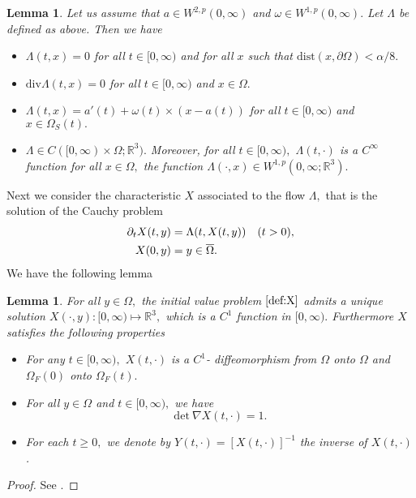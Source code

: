 \documentclass[12pt,a4paper,reqno]{amsart}
\newtheorem{lemma}[theorem]{Lemma}
\theoremstyle{definition}
\theoremstyle{remark}
\numberwithin{equation}{section}
\newcommand{\ost}{\Omega_{S}(t)}
\newcommand{\oft}{\Omega_{F}(t)}
\newcommand{\ofo}{\Omega_{F}(0)}
\newcommand{\rt}{\mathbb{R}^{3}}
\begin{document}
\begin{lemma}
Let us assume that $a \in W^{2,p}(0,\infty)$ and $\omega \in W^{1,p}(0,\infty).$ Let $\Lambda$ be defined as above. Then we have
\begin{itemize}
\item $\Lambda(t,x) = 0$ for all $t \in [0,\infty)$ and for all $x$ such that $\mathrm{dist}(x,\partial \Omega) < \alpha/8.$
\item $\mathrm{div} \Lambda(t,x) = 0$ for all $t \in [0,\infty)$ and $x \in \Omega.$
\item $\Lambda(t,x) = a'(t) + \omega(t) \times (x - a(t)) $ for all $t \in [0,\infty)$ and $x \in \ost.$
\item $\Lambda \in C([0,\infty) \times \Omega;\rt).$ Moreover, for all $t\in [0,\infty),$  $\Lambda(t,\cdot)$ is a $C^{\infty}$ function for all $x \in \Omega,$ the function $\Lambda(\cdot,x) \in W^{1,p}(0,\infty;\rt).$ 
\end{itemize}
\end{lemma}

Next we consider the characteristic $X$ associated to the flow $\Lambda,$ that is the solution of the Cauchy problem
\begin{align} \label{def:X}
\partial_{t}  X(t,y) & =  \Lambda(t,X(t,y))  \quad (t >0), \notag \\
X(0,y)               &  = y\in \overline{\Omega}.
\end{align}
We have the following lemma
\begin{lemma} \label{lem:jd}
For all $y \in \Omega,$ the initial value problem $\eqref{def:X}$ admits a unique solution $X(\cdot,y) : [0,\infty) \mapsto \rt,$ which is a $C^{1}$ function in $[0,\infty).$  Furthermore $X$ satisfies the following properties
\begin{itemize}
\item For any $t \in [0,\infty),$ $X(t,\cdot)$ is a  $C^{1}$- diffeomorphism  from $\Omega$ onto $\Omega$ and $\ofo$ onto $\oft.$
\item For all $y \in \Omega$ and $t \in [0,\infty),$ we have
\[ \mathrm{det} \ \nabla X(t,\cdot) = 1.\]
\item  For each $t \geqslant 0,$  we denote by $Y(t,\cdot) = [X(t,\cdot)]^{-1}$ the
inverse of $X(t,\cdot)$.
\end{itemize}
\end{lemma}
\begin{proof}
See \cite[Lemma 2.2]{Cum08}.
\end{proof}
\end{document}
